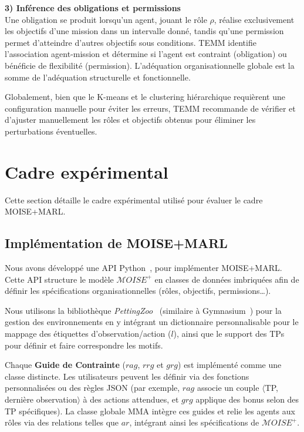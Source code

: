 \documentclass[francais,ROIA,Unicode,manuscript]{cedram}
\begin{document}
\noindent\textbf{3) Inférence des obligations et permissions} \\
Une obligation se produit lorsqu'un agent, jouant le rôle \(\rho\), réalise exclusivement les objectifs d'une mission dans un intervalle donné, tandis qu'une permission permet d'atteindre d'autres objectifs sous conditions. TEMM identifie l'association agent-mission et détermine si l'agent est contraint (obligation) ou bénéficie de flexibilité (permission). L'adéquation organisationnelle globale est la somme de l'adéquation structurelle et fonctionnelle.

Globalement, bien que le K-means et le clustering hiérarchique requièrent une configuration manuelle pour éviter les erreurs, TEMM recommande de vérifier et d'ajuster manuellement les rôles et objectifs obtenus pour éliminer les perturbations éventuelles.


\section{Cadre expérimental}
\label{sec:experimental_setup}

Cette section détaille le cadre expérimental utilisé pour évaluer le cadre MOISE+MARL.

\subsection{Implémentation de MOISE+MARL}

Nous avons développé une API Python~\hyperref[fn:github]{\footnotemark[2]}, pour implémenter MOISE+MARL. Cette API structure le modèle \(\mathcal{M}OISE^+\) en classes de données imbriquées afin de définir les spécifications organisationnelles (rôles, objectifs, permissions\dots).

Nous utilisons la bibliothèque \textit{PettingZoo}~\cite{terry2020pettingzoo} (similaire à Gymnasium~\cite{kwiatkowski2024}) pour la gestion des environnements en y intégrant un dictionnaire personnalisable pour le mappage des étiquettes d'observation/action (\(l\)), ainsi que le support des TPs pour définir et faire correspondre les motifs.

Chaque \textbf{Guide de Contrainte} (\(rag\), \(rrg\) et \(grg\)) est implémenté comme une classe distincte. Les utilisateurs peuvent les définir via des fonctions personnalisées ou des règles JSON (par exemple, \(rag\) associe un couple \(\langle\)TP, dernière observation\(\rangle\) à des actions attendues, et \(grg\) applique des bonus selon des TP spécifiques). La classe globale MMA intègre ces guides et relie les agents aux rôles via des relations telles que \(ar\), intégrant ainsi les spécifications de \(\mathcal{M}OISE^+\).
\end{document}
